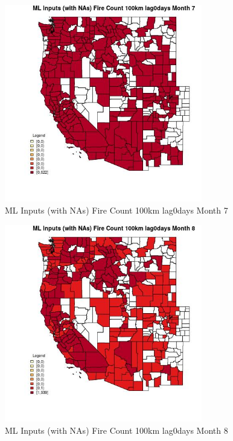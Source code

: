 \clearpage 

\begin{figure} 
\centering  
\includegraphics[width=0.77\textwidth]{Code_Outputs/Report_ML_input_PM25_Step4_part_e_de_duplicated_aves_compiled_2019-05-21wNAs_CountyFire_Count_100km_lag0daysmedianMonth7.jpg} 
\caption{\label{fig:Report_ML_input_PM25_Step4_part_e_de_duplicated_aves_compiled_2019-05-21wNAsCountyFire_Count_100km_lag0daysmedianMonth7}ML Inputs (with NAs) Fire Count 100km lag0days Month 7} 
\end{figure} 
 

\begin{figure} 
\centering  
\includegraphics[width=0.77\textwidth]{Code_Outputs/Report_ML_input_PM25_Step4_part_e_de_duplicated_aves_compiled_2019-05-21wNAs_CountyFire_Count_100km_lag0daysmedianMonth8.jpg} 
\caption{\label{fig:Report_ML_input_PM25_Step4_part_e_de_duplicated_aves_compiled_2019-05-21wNAsCountyFire_Count_100km_lag0daysmedianMonth8}ML Inputs (with NAs) Fire Count 100km lag0days Month 8} 
\end{figure} 
 

